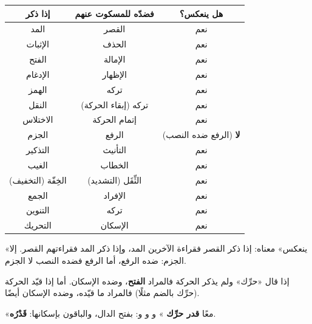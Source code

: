 \begin{qaida}
\centering
\renewcommand{\arraystretch}{1.4}
\begin{tabular}{c c c}
\toprule
\textbf{إذا ذكر} & \textbf{فضدّه للمسكوت عنهم} & \textbf{هل ينعكس؟}\\
\midrule
المد & القصر & نعم\\
الإثبات & الحذف & نعم\\
الفتح & الإمالة & نعم\\
الإدغام & الإظهار & نعم\\
الهمز & تركه & نعم\\
النقل & تركه (إبقاء الحركة) & نعم\\
الاختلاس & إتمام الحركة & نعم\\
الجزم & الرفع & \textbf{لا} (الرفع ضده النصب)\\
التذكير & التأنيث & نعم\\
الغيب & الخطاب & نعم\\
الخِفّة (التخفيف) & الثِّقَل (التشديد) & نعم\\
الجمع & الإفراد & نعم\\
التنوين & تركه & نعم\\
التحريك & الإسكان & نعم\\
\bottomrule
\end{tabular}

\smallskip\raggedleft
«ينعكس» معناه: إذا ذكر القصر فقراءة الآخرين المد، وإذا ذكر المد فقراءتهم القصر. إلا الجزم: ضده الرفع، أما الرفع فضده النصب لا الجزم.
\end{qaida}

\begin{mufradat}
\end{mufradat}
\maana إذا قال «حرِّك» ولم يذكر الحركة فالمراد \textbf{الفتح}، وضده الإسكان. أما إذا قيّد الحركة (حرِّك بالضم مثلًا) فالمراد ما قيّده، وضده الإسكان أيضًا.
\begin{amthila}
«معًا \textbf{قدر حرِّك}  » \ila{} \IbnDhakwan{} و\Hafs{} و\Hamza{} و\Kisai:   بفتح الدال، والباقون بإسكانها: \textbf{قَدْرُه}.
\end{amthila}


